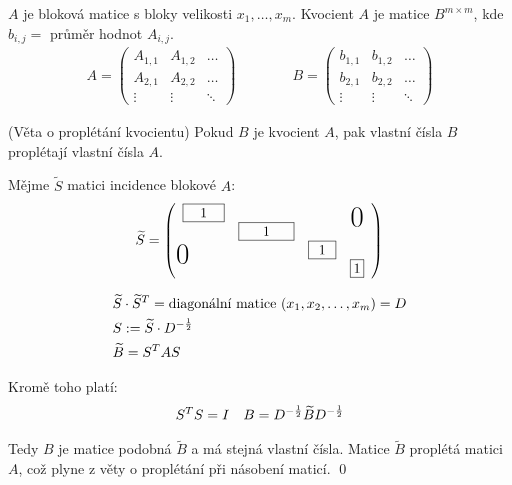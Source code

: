 \df $A$ je bloková matice s bloky velikosti $x_1, \dots, x_m$. Kvocient $A$ je matice $B^{m\times m}$, kde $b_{i,j} = $ průměr hodnot $A_{i,j}$.
\begin{align*}
	A = \left(\begin{matrix}
		A_{1,1} & A_{1,2} & \dots \\
		A_{2,1} & A_{2,2} & \dots \\
		\vdots & \vdots & \ddots 
		\end{matrix}\right)
	\qquad
	\qquad
	B = \left(\begin{matrix}
		b_{1,1} & b_{1,2} & \dots \\
		b_{2,1} & b_{2,2} & \dots \\
		\vdots & \vdots & \ddots 
		\end{matrix}\right)
\end{align*}

\vt (Věta o proplétání kvocientu) Pokud $B$ je kvocient $A$, pak vlastní čísla
$B$ proplétají vlastní čísla $A$.

\dk Mějme $\widetilde S$ matici incidence blokové $A$:
\begin{align*}
	\widetilde S = \left(\begin{array}{llll}
		\framebox[3em][c]{1} & & & \hfil\bigzero \\
		& \framebox[4em][c]{1} & & \\
		\bigzero & & \framebox[2em][c]{1} & \\
		& & & \framebox[1em][c]{1}
		\end{array}\right)
\end{align*}

\begin{align*}
	& \widetilde S\cdot\widetilde S^T = \text{diagonální matice } (x_1, x_2, \dots, x_m) = D \\
	& S := \widetilde S \cdot D^{-{1\over2}} \\
	& \widetilde B = S^TAS
\end{align*}

Kromě toho platí:
\begin{align*}
	& S^TS = I
	& B = D^{-{1\over2}}\widetilde BD^{-{1\over2}}
\end{align*}

Tedy $B$ je matice podobná $\widetilde B$ a má stejná vlastní čísla. Matice
$\widetilde B$ proplétá matici $A$, což plyne z věty o proplétání při násobení
maticí. \qed
